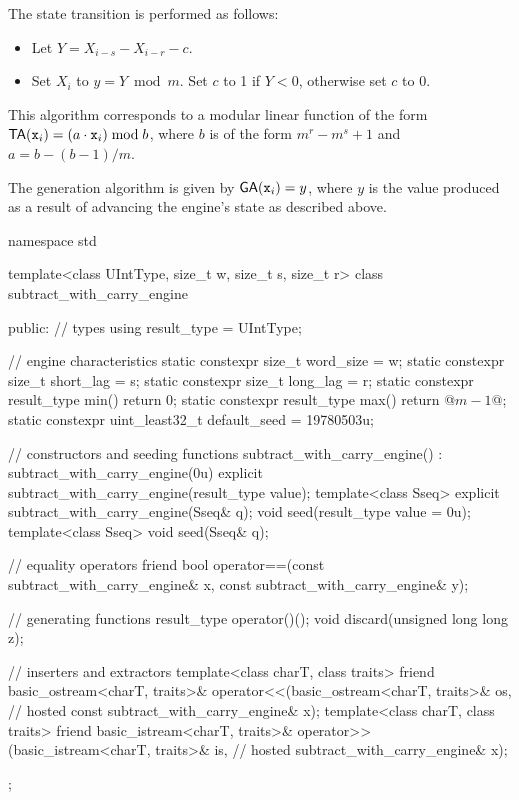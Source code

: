 \pnum
The state transition
is performed as follows:
\begin{itemize}
 \item
   Let $Y = X_{i-s} - X_{i-r} - c$.
 \item
   Set $X_i$ to $y = Y \bmod m$.
   Set $c$ to 1 if $Y < 0$,
   otherwise set $c$ to 0.
\end{itemize}
\begin{note}
 This algorithm corresponds
 to a modular linear function
 of the form
 $\mathsf{TA}(\texttt{\protect x}_{i}) = (a \cdot \texttt{\protect x}_{i}) \bmod b$,
 where $b$ is of the form
 $m^r - m^s + 1$
 and $a = b - (b - 1) / m$.
\end{note}

\pnum
The generation algorithm
is given by $\mathsf{GA}(\texttt{\protect x}_{i}) = y$,
where $y$ is the value produced as a result
of advancing the engine's state as described above.

%
%
\begin{codeblock}
namespace std {
  template<class UIntType, size_t w, size_t s, size_t r>
  class subtract_with_carry_engine {
  public:
    // types
    using result_type = UIntType;

    // engine characteristics
    static constexpr size_t word_size = w;
    static constexpr size_t short_lag = s;
    static constexpr size_t long_lag = r;
    static constexpr result_type min() { return 0; }
    static constexpr result_type max() { return @$m - 1$@; }
    static constexpr uint_least32_t default_seed = 19780503u;

    // constructors and seeding functions
    subtract_with_carry_engine() : subtract_with_carry_engine(0u) {}
    explicit subtract_with_carry_engine(result_type value);
    template<class Sseq> explicit subtract_with_carry_engine(Sseq& q);
    void seed(result_type value = 0u);
    template<class Sseq> void seed(Sseq& q);

    // equality operators
    friend bool operator==(const subtract_with_carry_engine& x,
                           const subtract_with_carry_engine& y);

    // generating functions
    result_type operator()();
    void discard(unsigned long long z);

    // inserters and extractors
    template<class charT, class traits>
      friend basic_ostream<charT, traits>&
        operator<<(basic_ostream<charT, traits>& os,            // hosted
                   const subtract_with_carry_engine& x);
    template<class charT, class traits>
      friend basic_istream<charT, traits>&
        operator>>(basic_istream<charT, traits>& is,            // hosted
                   subtract_with_carry_engine& x);
  };
}
\end{codeblock}

